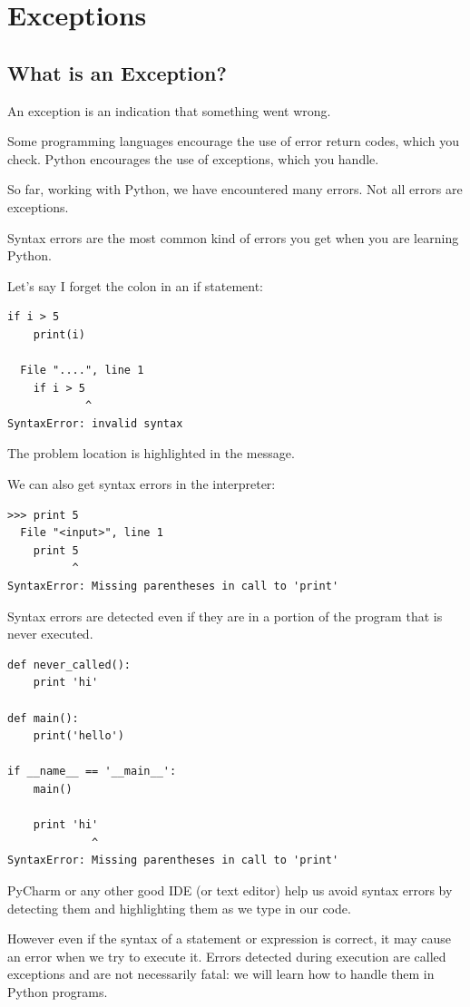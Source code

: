 \documentclass{article}
\begin{document}
\section{Exceptions}
\subsection{What is an Exception?}

An exception is an indication that something went wrong.

Some programming languages encourage the use of error return codes, which you check. Python encourages the use of exceptions, which you handle.

So far, working with Python, we have encountered many errors.  Not all errors are exceptions.

Syntax errors are the most common kind of errors you get when you are learning Python.  

Let's say I forget the colon in an if statement:

\begin{lstlisting}
if i > 5
    print(i)
 
  File "....", line 1
    if i > 5
            ^
SyntaxError: invalid syntax
\end{lstlisting}

The problem location is highlighted in the message. 

We can also get syntax errors in the interpreter:

\begin{lstlisting}
>>> print 5
  File "<input>", line 1
    print 5
          ^
SyntaxError: Missing parentheses in call to 'print'
\end{lstlisting}

Syntax errors are detected even if they are in a portion of the program that is never executed.

\begin{lstlisting}
def never_called():
    print 'hi'
 
def main():
    print('hello')
 
if __name__ == '__main__':
    main()
 
    print 'hi'
             ^
SyntaxError: Missing parentheses in call to 'print'
\end{lstlisting}

PyCharm or any other good IDE (or text editor) help us avoid syntax errors by detecting them and highlighting them as we type in our code.

However even if the syntax of a statement or expression is correct, it may cause an error when we try to execute it.   Errors detected during execution are called exceptions and are not necessarily fatal: we will learn how to handle them in Python programs.
\end{document}
